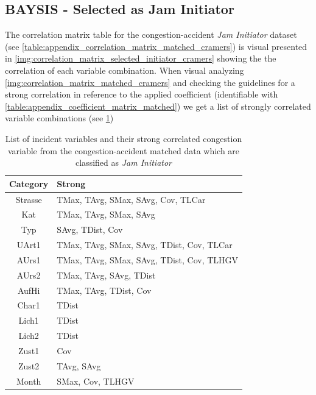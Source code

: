 \subsection{BAYSIS - Selected as Jam Initiator}
\label{analysis_processing_correlation_baysis_initiator}
The correlation matrix table for the congestion-accident \textit{Jam Initiator} dataset (see \cref{table:appendix_correlation_matrix_matched_cramers}) is visual presented in \cref{img:correlation_matrix_selected_initiator_cramers} showing the the correlation of each variable combination. When visual analyzing \cref{img:correlation_matrix_matched_cramers} and checking the guidelines for a strong correlation in reference to the applied coefficient (identifiable with \cref{table:appendix_coefficient_matrix_matched}) we get a list of strongly correlated variable combinations (see \cref{tbl:correlation_list_baysis_initiator})

\noindent
\begin{table}[ht]
	\centering
	\begin{tabular}{c|l}  
		\toprule
		\textbf{Category} & \textbf{Strong} \\
		\midrule
		Strasse & TMax, TAvg, SMax, SAvg, Cov, TLCar \\ 
 		Kat & TMax, TAvg, SMax, SAvg \\ 
 		Typ & SAvg, TDist, Cov \\
 		UArt1 & TMax, TAvg, SMax, SAvg, TDist, Cov, TLCar \\
 		AUrs1 & TMax, TAvg, SMax, SAvg, TDist, Cov, TLHGV \\
 		AUrs2 & TMax, TAvg, SAvg, TDist \\
 		AufHi & TMax, TAvg, TDist, Cov \\
 		Char1 & TDist \\
 		Lich1 & TDist \\
 		Lich2 & TDist \\
 		Zust1 & Cov \\
 		Zust2 & TAvg, SAvg \\
 		Month & SMax, Cov, TLHGV \\
 		\bottomrule
	\end{tabular}
	\caption{List of incident variables and their strong correlated congestion variable from the congestion-accident matched data which are classified as \textit{Jam Initiator}}
	\label{tbl:correlation_list_baysis_initiator}
\end{table}

